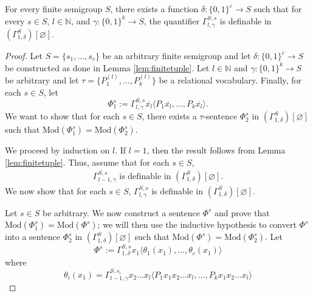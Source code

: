 \documentclass[a4paper,UKenglish,cleveref, autoref, thm-restate, anonymous]{lipics-v2021}
\begin{document}
\begin{theorem}\label{thm:finitebinding}
    For every finite semigroup $S$, there exists a function $\delta : \{0,1\}^c \rightarrow S$ such that for every $s \in S$, $l \in \mathbb{N}$, and $\gamma : \{0,1\}^k \rightarrow S$, the quantifier $\Gamma^{S,s}_{l,\gamma}$ is definable in $(\Gamma^{S}_{1,\delta})[\varnothing]$.
\end{theorem}
\begin{proof}
    Let $S = \{s_1, \dots, s_c\}$ be an arbitrary finite semigroup and let $\delta : \{0,1\}^c \rightarrow S$ be constructed as done in Lemma \ref{lem:finitetuple}. Let $l \in \mathbb{N}$ and $\gamma : \{0,1\}^k \rightarrow S$ be arbitrary and let $\tau = \{P_1^{(l)}, \dots, P_k^{(l)}\}$ be a relational vocabulary. Finally, for each $s \in S$, let \[
        \Phi_1^s := \Gamma^{S,s}_{l,\gamma}\overline{x_l}\langle P_1 \overline{x_l}, \dots, P_k \overline{x_l}\rangle.
    \] We want to show that for each $s \in S$, there exists a $\tau$-sentence $\Phi_2^s$ in $(\Gamma^S_{1,\delta})[\varnothing]$ such that $\text{Mod}(\Phi_1^s) = \text{Mod}(\Phi_2^s)$.

    We proceed by induction on $l$. If $l=1$, then the result follows from Lemma \ref{lem:finitetuple}. Thus, assume that for each $s \in S$,
    \begin{align*}
        \text{$\Gamma^{S,s}_{l-1,\gamma}$ is definable in $(\Gamma^{S}_{1,\delta})[\varnothing]$.}\tag{I.H.}
    \end{align*}
    We now show that for each $s \in S$, $\Gamma^{S,s}_{l,\gamma}$ is definable in $(\Gamma^{S}_{1,\delta})[\varnothing]$.

    \iffalse
    By Lemma \ref{lem:finitetuple}, we know that there is a sentence of the form \[
        \Phi_1' := \Gamma^{S,s}_{l,\delta}\overline{x_l}\langle \psi_1(\overline{x_l}), \dots, \psi_c(\overline{x_l})\rangle,
    \] where each $\psi_i$ is a boolean combination of $P_1,\dots,P_k$, such that $\text{Mod}(\Phi_1) = \text{Mod}(\Phi_1')$.
    \fi

    Let $s \in S$ be arbitrary. We now construct a sentence $\Phi^s$ and prove that $\text{Mod}(\Phi_1^s) = \text{Mod}(\Phi^s)$; we will then use the inductive hypothesis to convert $\Phi^s$ into a sentence $\Phi_2^s$ in $(\Gamma^S_{1,\delta})[\varnothing]$ such that $\text{Mod}(\Phi^s) = \text{Mod}(\Phi_2^s)$. Let \[
        \Phi^s := \Gamma^{S,s}_{1,\delta}x_1\langle \theta_1(x_1), \dots, \theta_c(x_1)\rangle
    \] where \[
        \theta_i (x_1) = \Gamma^{S,s_i}_{l-1,\gamma}x_2\dots x_l\langle P_1 x_1x_2\dots x_l, \dots, P_k x_1x_2\dots x_l\rangle
    \]


\end{proof}
\end{document}
